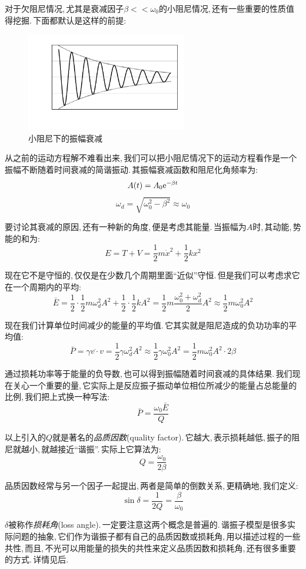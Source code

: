 对于欠阻尼情况,\,尤其是衰减因子$\beta<<\omega_0$的小阻尼情况,\,还有一些重要的性质值得挖掘.\,下面都默认是这样的前提:

\begin{figure}
\centering
\includegraphics[width=7cm]{image/6-3-2.png}
\caption{\quad 小阻尼下的振幅衰减}
\end{figure}
从之前的运动方程解不难看出来,\,我们可以把小阻尼情况下的运动方程看作是一个振幅不断随着时间衰减的简谐振动.\,其振幅衰减函数和阻尼化角频率为:
\[A(t)=A_0{\rm e}^{-\beta t}\]
\[\omega_d=\sqrt{\omega_0^2-\beta^2}\approx \omega_0\]

要讨论其衰减的原因,\,还有一种新的角度,\,便是考虑其能量.\,当振幅为$A$时,\,其动能,\,势能的和为:
\[E=T+V=\frac{1}{2}m\dot{x}^2+\frac{1}{2}kx^2\]

现在它不是守恒的,\,仅仅是在少数几个周期里面``近似''守恒.\,但是我们可以考虑求它在一个周期内的平均:
\[\bar{E}=\frac{1}{2}\cdot\frac{1}{2}m\omega_d^2 A^2+\frac{1}{2}\cdot\frac{1}{2} kA^2=\frac{1}{2}m\frac{\omega_0^2+\omega_d^2}{2} A^2\approx \frac{1}{2}m\omega_0^2 A^2\]

现在我们计算单位时间减少的能量的平均值.\,它其实就是阻尼造成的负功功率的平均值:
\[\bar{P}=\overline{\gamma v\cdot v}=\frac{1}{2}\gamma \omega_d^2 A^2\approx \frac{1}{2}\gamma \omega_0^2 A^2=\frac{1}{2}m \omega_0^2 A^2\cdot 2\beta\]

通过损耗功率等于能量的负导数,\,也可以得到振幅随着时间衰减的具体结果.\,我们现在关心一个重要的量,\,它实际上是反应振子振动单位相位所减少的能量占总能量的比例,\,我们把上式换一种写法:
\[\bar{P}=\frac{\omega_0\bar{E}}{Q}\]

以上引入的$Q$就是著名的\emph{品质因数}(quality factor).\,它越大,\,表示损耗越低,\,振子的阻尼就越小,\,就越接近``谐振''.\,实际上它算法为:
\[Q=\frac{\omega_0}{2\beta}\]

品质因数经常与另一个因子一起提出,\,两者是简单的倒数关系,\,更精确地,\,我们定义:
\[\sin\delta=\frac{1}{2Q}=\frac{\beta}{\omega_0}\]

$\delta$被称作\emph{损耗角}(loss angle).\,一定要注意这两个概念是普遍的.\,谐振子模型是很多实际问题的抽象,\,它们作为谐振子都有自己的品质因数或损耗角,\,用以描述过程的一些共性,\,而且,\,不光可以用能量的损失的共性来定义品质因数和损耗角,\,还有很多重要的方式.\,详情见后.

